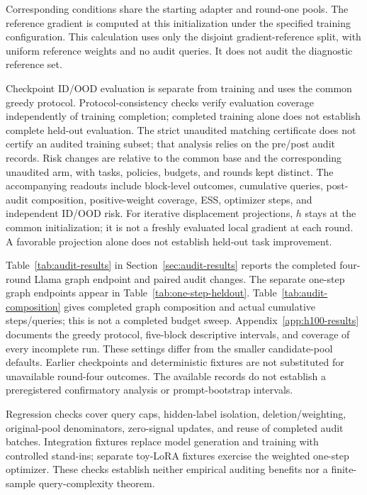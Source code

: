 Corresponding conditions share the starting adapter and round-one pools.
The reference gradient is computed at this initialization under the
specified training configuration. This calculation uses
only the disjoint gradient-reference split, with uniform reference weights
and no audit queries. It does not audit the diagnostic reference set.

Checkpoint ID/OOD evaluation is separate from training and uses the
common greedy protocol. Protocol-consistency checks verify evaluation
coverage independently of training completion; completed training alone
does not establish complete held-out evaluation.
The strict unaudited matching certificate does not certify an
audited training subset; that analysis relies on the pre/post audit records.
Risk changes are relative to the common base and the corresponding
unaudited arm, with tasks, policies, budgets, and rounds kept distinct.
The accompanying readouts include block-level outcomes, cumulative queries,
post-audit composition, positive-weight coverage, ESS, optimizer steps, and
independent ID/OOD risk. For iterative displacement projections, $h$ stays at the common
initialization; it is not a freshly evaluated local gradient at each round.
A favorable projection alone does not establish held-out task improvement.

Table~\ref{tab:audit-results} in Section~\ref{sec:audit-results} reports
the completed four-round Llama graph endpoint and paired audit changes.
The separate one-step graph endpoints appear in Table~\ref{tab:one-step-heldout}.
Table~\ref{tab:audit-composition} gives completed graph composition and
actual cumulative steps/queries; this is not a completed budget sweep.
Appendix~\ref{app:h100-results} documents the greedy protocol, five-block descriptive
intervals, and coverage of every incomplete run. These settings differ
from the smaller candidate-pool defaults.
Earlier checkpoints and deterministic fixtures are not substituted
for unavailable round-four outcomes. The available records do not
establish a preregistered confirmatory analysis or prompt-bootstrap intervals.



Regression checks cover query caps,
hidden-label isolation, deletion/weighting, original-pool denominators,
zero-signal updates, and reuse of completed audit batches. Integration
fixtures replace model generation and training with controlled stand-ins;
separate toy-LoRA fixtures exercise the weighted one-step optimizer.
These checks establish neither empirical auditing benefits nor a
finite-sample query-complexity theorem.


